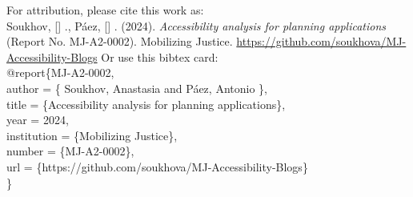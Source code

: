 \documentclass[12pt, oneside]{report}
\newcommand*{\ExtractFirstChar}[1]{%
        \StrChar{#1}{1}[\FirstChar]%
    \FirstChar
}
\begin{document}
  \vskip 20pt
  For attribution, please cite this work as:\\
  \vskip 1pt
            {Soukhov, \ExtractFirstChar{Anastasia}.,}
              {Páez, \ExtractFirstChar{Antonio}.}
   (2024). \textit{Accessibility analysis for planning
applications} (Report No. MJ-A2-0002). Mobilizing Justice. \url{https://github.com/soukhova/MJ-Accessibility-Blogs}
  \vskip 20pt
  Or use this bibtex card:\\
  \vskip 1pt
  @report\{MJ-A2-0002,\\
           \hspace*{1.6cm} author = \{                                                                                  {Soukhov, Anastasia and} 
                                                                                                                          {Páez, Antonio}
                                                                                \},\\
           \hspace*{1.6cm} title = \{Accessibility analysis for planning
applications\},\\
           \hspace*{1.6cm} year = {2024},\\
           \hspace*{1.6cm} institution = \{Mobilizing Justice\},\\
           \hspace*{1.6cm} number = \{MJ-A2-0002\},\\
           \hspace*{1.6cm} url = \{https://github.com/soukhova/MJ-Accessibility-Blogs\}\\
  \}

\vspace*{\fill}
{}
\end{document}
